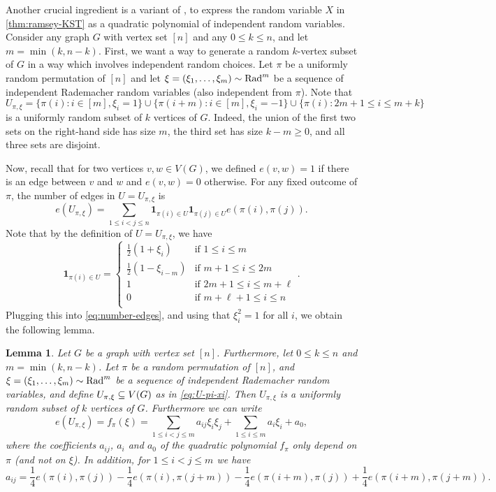 \documentclass{daj}
\theoremstyle{plain}
\theoremstyle{plain}
\newtheorem{lem}[thm]{Lemma}
\theoremstyle{plain}
\theoremstyle{plain}
\theoremstyle{definition}
\theoremstyle{plain}
\theoremstyle{plain}
\theoremstyle{definition}
\theoremstyle{definition}
\theoremstyle{plain}
\begin{document}
Another crucial ingredient is a variant of \cite[Lemma~2.8]{KST}, to express the random variable $X$ in \cref{thm:ramsey-KST} as a quadratic polynomial of independent random variables. Consider any graph $G$ with vertex set $[n]$ and any $0\leq k\leq n$, and let $m=\min(k,n-k)$. First, we want a way to generate a random $k$-vertex subset of $G$ in a way which involves independent random choices. Let $\pi$ be a uniformly random permutation of $[n]$ and let $\xi=(\xi_1,\dots,\xi_m)\sim\operatorname{Rad}^m$ be a sequence of independent Rademacher random variables (also independent from $\pi$). Note that
\begin{equation}\label{eq:U-pi-xi}
U_{\pi,\xi}=\lbrace \pi(i): i\in [m], \xi_i=1\rbrace\cup \lbrace \pi(i+m): i\in [m], \xi_i=-1\rbrace\cup \lbrace \pi(i): 2m+1\leq i\leq m+k\rbrace
\end{equation}
is a uniformly random subset of $k$ vertices of $G$. Indeed, the union of the first two sets on the right-hand side has size $m$, the third set has size $k-m\geq 0$, and all three sets are disjoint.

Now, recall that for two vertices $v,w\in V(G)$, we defined $e(v,w)=1$ if there is an edge between $v$ and $w$ and $e(v,w)=0$ otherwise. For any fixed outcome of $\pi$, the number of edges in $U=U_{\pi,\xi}$ is
\begin{equation}\label{eq:number-edges}
e(U_{\pi,\xi})=\sum_{1\leq i<j\leq n}\mathbf{1}_{\pi(i)\in U}\mathbf{1}_{\pi(j)\in U}e(\pi(i),\pi(j)).
\end{equation}
Note that by the definition of $U=U_{\pi,\xi}$, we have
\[\mathbf{1}_{\pi(i)\in U}=
\begin{cases}
\frac{1}{2}(1+\xi_i)&\text{if }1\leq i\leq m\\
\frac{1}{2}(1-\xi_{i-m})&\text{if }m+1\leq i\leq 2m\\
1&\text{if }2m+1\leq i\leq m+\ell\\
0&\text{if }m+\ell+1\leq i\leq n\\
\end{cases}.\]
Plugging this into \cref{eq:number-edges}, and using that $\xi_i^2=1$ for all $i$, we obtain the following lemma.

\begin{lem}
\label{lem:KST-coupling}
Let $G$ be a graph with vertex set $[n]$. Furthermore, let $0\leq k\leq n$ and $m=\min(k,n-k)$. Let $\pi$ be a random permutation of $[n]$, and $\xi=(\xi_1,\dots,\xi_m)\sim\operatorname{Rad}^m$ be a sequence of independent Rademacher random variables, and define $U_{\pi,\xi}\subseteq V(G)$ as in \cref{eq:U-pi-xi}. Then $U_{\pi,\xi}$ is a uniformly random  subset of $k$ vertices of $G$. Furthermore we can write 
\[e(U_{\pi,\xi})=f_\pi(\xi)=\sum_{1\leq i<j\leq m}a_{ij}\xi_i\xi_j+\sum_{1\leq i\leq m}a_i\xi_i+a_0,\]
where the coefficients $a_{ij}$, $a_i$ and $a_0$ of the quadratic polynomial $f_\pi$ only depend on $\pi$ (and not on $\xi$). In addition, for $1\le i<j\le m$ we have
\begin{equation}\label{eq-value-a-ij}
a_{ij}=\frac{1}{4}e(\pi(i),\pi(j))-\frac{1}{4}e(\pi(i),\pi(j+m))-\frac{1}{4}e(\pi(i+m),\pi(j))+\frac{1}{4}e(\pi(i+m),\pi(j+m)).
\end{equation}
\end{lem}
\end{document}
